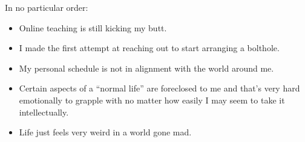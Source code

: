 In no particular order:

\begin{itemize}
\tightlist
\item
  Online teaching is still kicking my butt.
\item
  I made the first attempt at reaching out to start arranging a
  bolthole.
\item
  My personal schedule is not in alignment with the world around me.
\item
  Certain aspects of a ``normal life'' are foreclosed to me and that's
  very hard emotionally to grapple with no matter how easily I may seem
  to take it intellectually.
\item
  Life just feels very weird in a world gone mad.
\end{itemize}
